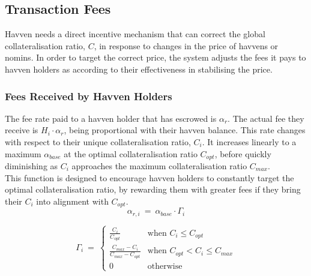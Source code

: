 \newpage
\subsection{Transaction Fees}
Havven needs a direct incentive mechanism that can correct the global
collateralisation ratio, $C$, in response to changes in the price of havvens
or nomins. In order to target the correct price, the system adjusts the fees
it pays to havven holders as according to their effectiveness in stabilising
the price.

\subsubsection{Fees Received by Havven Holders}

\noindent The fee rate paid to a havven holder that has escrowed is
$\alpha_r$. The actual fee they receive is $H_i \cdot \alpha_r$, being
proportional with their havven balance. This rate changes with respect to
their unique collateralisation ratio, $C_i$. It increases linearly to a
maximum $\alpha_{base}$ at the optimal collateralisation ratio $C_{opt}$,
before quickly diminishing as $C_i$ approaches the maximum collateralisation
ratio $C_{max}$. \\

\noindent This function is designed to encourage havven holders to constantly
target the optimal collateralisation ratio, by rewarding them with greater
fees if they bring their $C_i$ into alignment with $C_{opt}$.\\

\begin{equation}
\alpha_{r,i} \ = \ \alpha_{base} \cdot \mathit{\Gamma}_{i}  \label{eq:feesreceived}
\end{equation}

\begin{equation}
\mathit{\Gamma}_{i} \ = \
\begin{cases}
 \frac{C_{i}}{C_{opt}} &\mbox{when } C_{i} \leq C_{opt} \\[1em]
 \frac{C_{max} - C_{i}}{C_{max} - C_{opt}} &\mbox{when } C_{opt} < C_{i} \leq C_{max} \\[1em]
 0 &\mbox{otherwise}
 \end{cases}
 \label{eq:7}
\end{equation}

\begin{center}
\end{center}

